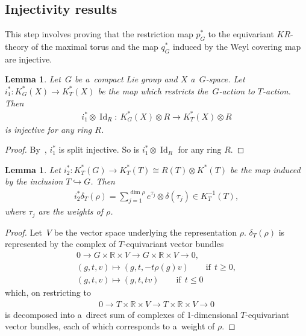 \documentclass[pdftex]{sigma}
\numberwithin{equation}{section}
\newtheorem{Lemma}[Theorem]{Lemma}
\DeclareMathOperator{\Id}{Id}
\begin{document}
\subsection{Injectivity results}
This step involves proving that the restriction map $p_G^*$ to the equivariant $KR$-theory of the maximal torus and the
map $q_G^*$ induced by the Weyl covering map are injective.
\begin{Lemma}
\label{ringinj}
Let~$G$ be a~compact Lie group and $X$ a~$G$-space.
Let $i_1^*: K_G^*(X)\to K^*_T(X)$ be the map which restricts the~$G$-action to $T$-action.
Then
\begin{gather*}
i_1^*\otimes\Id_R: \  K^*_G(X)\otimes R\to K_T^*(X)\otimes R
\end{gather*}
is injective for any ring $R$.
\end{Lemma}
\begin{proof}
By~\cite[Proposition 4.9]{At4}, $i_1^*$ is split injective.
So is $i_1^*\otimes\Id_R$ for any ring $R$.
\end{proof}
\begin{Lemma}
\label{decomposition}
Let $i_2^*: K_T^*(G)\to K_T^*(T)\cong R(T)\otimes K^*(T)$ be the map induced by the inclusion $T\hookrightarrow G$.
Then
\begin{gather*}
i_2^*\delta_T(\rho)=
\sum\limits_{j=1}^{\dim\rho}e^{\tau_j}\otimes\delta(\tau_j)\in K_T^{-1}(T),
\end{gather*}
where $\tau_j$ are the weights of $\rho$.
\end{Lemma}
\begin{proof}
Let~$V$ be the vector space underlying the representation $\rho$.
$\delta_T(\rho)$ is represented by the complex of $T$-equivariant vector bundles
\begin{gather*}
0\longrightarrow G\times\mathbb{R}\times V \longrightarrow G\times\mathbb{R}\times V\longrightarrow 0,
\\
(g, t, v)  \mapsto  (g, t, -t\rho(g)v) \qquad\text{if} \ \ t\geq 0,
\\
(g, t, v)  \mapsto  (g, t, tv) \qquad\text{if} \ \ t\leq 0
\end{gather*}
which, on restricting to
\begin{gather*}
0\longrightarrow T\times\mathbb{R}\times V
\stackrel{}
{\longrightarrow}T\times\mathbb{R}\times V\longrightarrow 0
\end{gather*}
is decomposed into a~direct sum of complexes of 1-dimensional $T$-equivariant vector bundles, each of which corresponds
to a~weight of $\rho$.
\end{proof}
\end{document}
